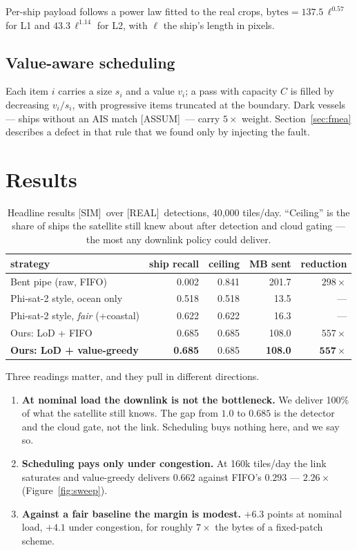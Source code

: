 \documentclass[10pt,a4paper]{article}
\newcommand{\REAL}{\textcolor{real}{\footnotesize\textsf{[REAL]}}}
\newcommand{\SIM}{\textcolor{sim}{\footnotesize\textsf{[SIM]}}}
\newcommand{\ASSUM}{\textcolor{warn}{\footnotesize\textsf{[ASSUM]}}}
\begin{document}
Per-ship payload follows a power law fitted to the real crops, $\text{bytes}=137.5\,\ell^{0.57}$
for L1 and $43.3\,\ell^{1.14}$ for L2, with $\ell$ the ship's length in pixels.

\subsection{Value-aware scheduling}\label{sec:sched}

Each item $i$ carries a size $s_i$ and a value $v_i$; a pass with capacity $C$ is filled by
decreasing $v_i/s_i$, with progressive items truncated at the boundary. Dark vessels --- ships
without an AIS match \ASSUM\ --- carry $5\times$ weight. Section~\ref{sec:fmea} describes a defect
in that rule that we found only by injecting the fault.

\section{Results}\label{sec:results}

\begin{table}[h]\centering\small
\caption{Headline results \SIM\ over \REAL\ detections, 40{,}000 tiles/day. ``Ceiling'' is the
share of ships the satellite still knew about after detection and cloud gating --- the most any
downlink policy could deliver.}
\begin{tabular}{lrrrr}
\toprule
strategy & ship recall & ceiling & MB sent & reduction \\
\midrule
Bent pipe (raw, FIFO) & 0.002 & 0.841 & 201.7 & $298\times$ \\
Phi-sat-2 style, ocean only & 0.518 & 0.518 & 13.5 & --- \\
Phi-sat-2 style, \emph{fair} (+coastal) & 0.622 & 0.622 & 16.3 & --- \\
Ours: LoD + FIFO & 0.685 & 0.685 & 108.0 & $557\times$ \\
\textbf{Ours: LoD + value-greedy} & \textbf{0.685} & 0.685 & \textbf{108.0} & $\mathbf{557\times}$ \\
\bottomrule
\end{tabular}
\end{table}

Three readings matter, and they pull in different directions.

\begin{enumerate}
\item \textbf{At nominal load the downlink is not the bottleneck.} We deliver 100\% of what the
  satellite still knows. The gap from $1.0$ to $0.685$ is the detector and the cloud gate, not the
  link. Scheduling buys nothing here, and we say so.
\item \textbf{Scheduling pays only under congestion.} At 160k tiles/day the link saturates and
  value-greedy delivers $0.662$ against FIFO's $0.293$ --- $2.26\times$
  (Figure~\ref{fig:sweep}).
\item \textbf{Against a fair baseline the margin is modest.} $+6.3$ points at nominal load,
  $+4.1$ under congestion, for roughly $7\times$ the bytes of a fixed-patch scheme.
\end{enumerate}
\end{document}
